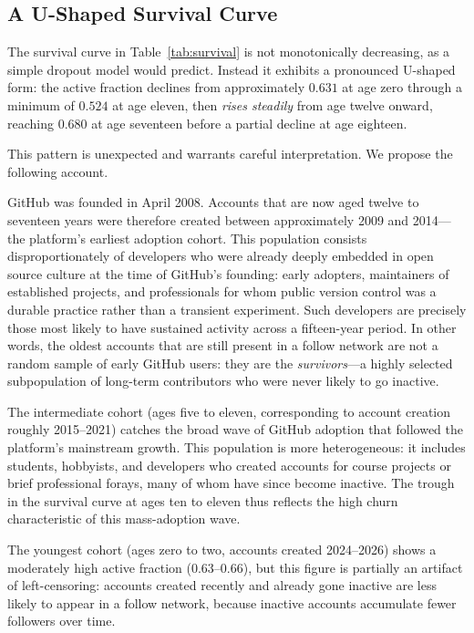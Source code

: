 \documentclass[12pt,a4paper]{article}
\begin{document}
\subsection{A U-Shaped Survival Curve}

The survival curve in Table~\ref{tab:survival} is not monotonically decreasing,
as a simple dropout model would predict. Instead it exhibits a pronounced
U-shaped form: the active fraction declines from approximately $0.631$ at age
zero through a minimum of $0.524$ at age eleven, then \emph{rises steadily} from
age twelve onward, reaching $0.680$ at age seventeen before a partial decline at
age eighteen.

This pattern is unexpected and warrants careful interpretation. We propose the
following account.

GitHub was founded in April 2008. Accounts that are now aged twelve to seventeen
years were therefore created between approximately 2009 and 2014---the platform's
earliest adoption cohort. This population consists disproportionately of
developers who were already deeply embedded in open source culture at the time of
GitHub's founding: early adopters, maintainers of established projects, and
professionals for whom public version control was a durable practice rather than
a transient experiment. Such developers are precisely those most likely to have
sustained activity across a fifteen-year period. In other words, the oldest
accounts that are still present in a follow network are not a random sample of
early GitHub users: they are the \emph{survivors}---a highly selected
subpopulation of long-term contributors who were never likely to go inactive.

The intermediate cohort (ages five to eleven, corresponding to account creation
roughly 2015--2021) catches the broad wave of GitHub adoption that followed the
platform's mainstream growth. This population is more heterogeneous: it includes
students, hobbyists, and developers who created accounts for course projects or
brief professional forays, many of whom have since become inactive. The trough in
the survival curve at ages ten to eleven thus reflects the high churn
characteristic of this mass-adoption wave.

The youngest cohort (ages zero to two, accounts created 2024--2026) shows a
moderately high active fraction ($0.63$--$0.66$), but this figure is partially
an artifact of left-censoring: accounts created recently and already gone
inactive are less likely to appear in a follow network, because inactive accounts
accumulate fewer followers over time.
\end{document}
